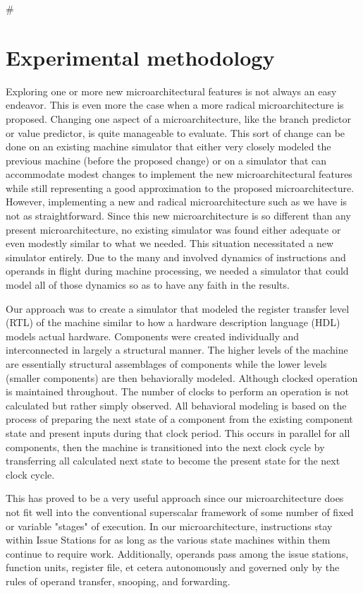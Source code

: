 #\documentclass[10pt,dvips]{article}
\begin{document}
\section{Experimental methodology}
%
Exploring one or more new microarchitectural features is
not always an easy endeavor.  This is even more the case
when a more radical microarchitecture is proposed.
Changing one aspect of a microarchitecture, like
the branch predictor or value predictor, is quite manageable to
evaluate.  This sort of change can be done on an existing machine simulator
that either very closely modeled the previous machine (before the
proposed change) or on a simulator that can accommodate modest
changes to implement the new microarchitectural features
while still representing a good approximation to the proposed
microarchitecture.
However, implementing a new and radical microarchitecture
such as we have is not as straightforward.
Since this new microarchitecture is so different than any
present microarchitecture, no existing simulator was found
either adequate or even modestly similar to what we needed.
This situation necessitated a new simulator entirely.
Due to the many and involved dynamics of instructions and
operands in flight during machine processing, we needed a simulator
that could model all of those dynamics so as to have
any faith in the results.  

Our approach was to create a simulator
that modeled the register transfer level (RTL) of the machine
similar to how a hardware description language (HDL) models
actual hardware.  Components were created individually
and interconnected in largely a structural manner.
The higher levels of the machine are essentially structural
assemblages of components while the lower levels (smaller components)
are then behaviorally modeled.  Although clocked operation is
maintained throughout.
The number of clocks to perform an operation is not calculated
but rather simply observed.  All behavioral modeling is
based on the process of preparing the next state of a component
from the existing component state and present inputs during that
clock period.  This occurs in parallel for all components,
then the machine is transitioned into the next clock cycle by
transferring all calculated next state to become the present
state for the next clock cycle.

This has proved to be a very useful approach since our
microarchitecture does not fit well into the conventional
superscalar framework of some number of fixed or variable "stages"
of execution.  In our microarchitecture, instructions stay
within Issue Stations for as long as the various state machines
within them continue to require work.  Additionally, operands
pass among the issue stations, function units, register file, et
cetera autonomously and governed only by the rules of operand
transfer, snooping, and forwarding.
\end{document}
